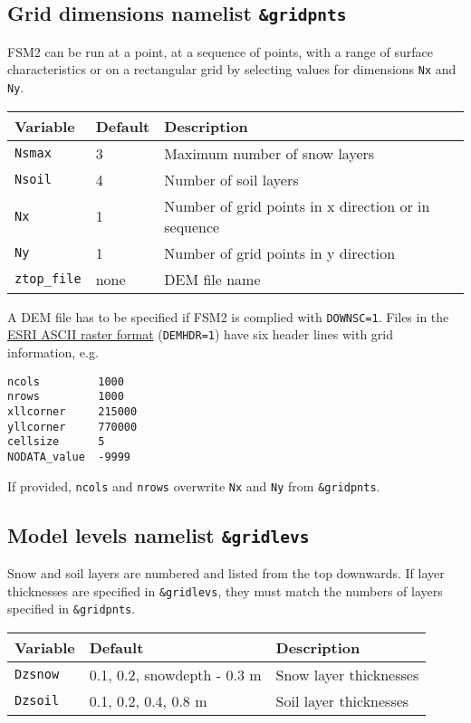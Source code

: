 \documentclass{article}
\begin{document}
\subsection{Grid dimensions namelist {\tt \&gridpnts}}
FSM2 can be run at a point, at a sequence of points, with a range of surface characteristics or on a rectangular grid by selecting values for dimensions {\tt Nx} and {\tt Ny}. 

\begin{longtable}{|l|l|l|}
\hline
Variable & Default & Description \\
\hline
{\tt Nsmax}      & 3    & Maximum number of snow layers                       \\
{\tt Nsoil}      & 4    & Number of soil layers                               \\
{\tt Nx}         & 1    & Number of grid points in x direction or in sequence \\
{\tt Ny}         & 1    & Number of grid points in y direction                \\
{\tt ztop\_file} & none & DEM file name                                       \\
\hline
\end{longtable}

A DEM file has to be specified if FSM2 is complied with {\tt DOWNSC=1}. Files in the \href{http://resources.esri.com/help/9.3/arcgisdesktop/com/gp_toolref/spatial_analyst_tools/esri_ascii_raster_format.htm}{ESRI ASCII raster format} ({\tt DEMHDR=1}) have six header lines with grid information, e.g.
{\tt\begin{verbatim}
ncols         1000
nrows         1000
xllcorner     215000
yllcorner     770000
cellsize      5
NODATA_value  -9999
\end{verbatim}}
If provided, {\tt ncols} and {\tt nrows} overwrite {\tt Nx} and {\tt Ny} from {\tt \&gridpnts}.

\subsection{Model levels namelist {\tt \&gridlevs}}
Snow and soil layers are numbered and listed from the top downwards. If layer thicknesses are specified in {\tt \&gridlevs}, they must match the numbers of layers specified in {\tt \&gridpnts}.

\begin{longtable}{|l|l|l|}
\hline
Variable     & Default                     & Description           \\
\hline
{\tt Dzsnow} & 0.1, 0.2, snowdepth - 0.3 m & Snow layer thicknesses \\
{\tt Dzsoil} & 0.1, 0.2, 0.4, 0.8 m        & Soil layer thicknesses \\
\hline
\end{longtable}
\end{document}
